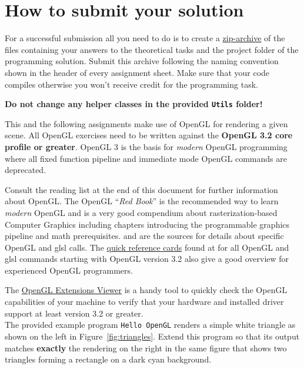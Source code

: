 \documentclass[12pt, a4paper, oneside, ngerman]{article}
\begin{document}
\section{How to submit your solution}
\label{sec:rules}
For a successful submission all you need to do is to create a \href{http://en.wikipedia.org/wiki/Zip_(file_format)}{zip-archive} of the files containing your answers to the theoretical tasks and the project folder of the programming solution. Submit this archive following the naming convention shown in the header of every assignment sheet. Make sure that your code compiles otherwise you won't receive credit for the programming task.

\textbf{Do not change any helper classes in the provided \texttt{Utils} folder!}


This and the following assignments make use of OpenGL for rendering a given scene. All OpenGL exercises need to be written against the \textbf{OpenGL 3.2 core profile or greater}. OpenGL 3 is the basis for \textit{modern} OpenGL programming where all fixed function pipeline and immediate mode OpenGL commands are deprecated.

Consult the reading list at the end of this document for further information about OpenGL. The OpenGL \enquote{\textit{Red Book}} \cite{RedBook} is the recommended way to learn \textit{modern} OpenGL and \cite{RTR3} is a very good compendium about rasterization-based Computer Graphics including chapters introducing the programmable graphics pipeline and math prerequisites. \cite{OglMan} and \cite{OglDoc} are the sources for details about specific OpenGL and \gls{glsl} calls. The \href{http://www.khronos.org/files/opengl-quick-reference-card.pdf}{quick reference cards} found at \cite{OglDoc} for all OpenGL and \gls{glsl} commands starting with OpenGL version 3.2 also give a good overview for experienced OpenGL programmers. 

The \href{http://www.realtech-vr.com/glview}{OpenGL Extensions Viewer} is a handy tool to quickly check the OpenGL capabilities of your machine to verify that your hardware and installed driver support at least version 3.2 or greater.\\

The provided example program \texttt{Hello OpenGL} renders a simple white triangle as shown on the left in Figure~\ref{fig:triangles}. Extend this program so that its output matches \textbf{exactly} the rendering on the right in the same figure that shows two triangles forming a rectangle on a dark cyan background. \\
\end{document}
